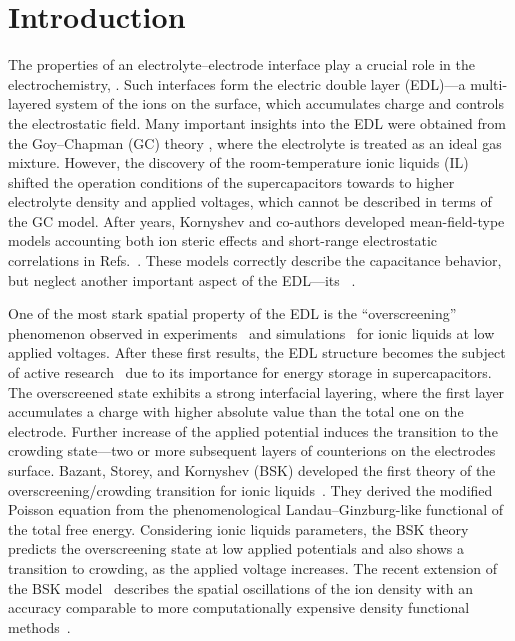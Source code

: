 \section{Introduction}
The properties of an electrolyte--electrode interface play a crucial role in the electrochemistry, . 
Such interfaces form the electric double layer (EDL)---a multi-layered system of the ions on the surface, which accumulates charge and controls the electrostatic field. Many important insights into the EDL were obtained from the Goy--Chapman (GC) theory , where the electrolyte is treated as an ideal gas mixture. However, the discovery of the room-temperature ionic liquids (IL) shifted the operation conditions of the supercapacitors towards to higher electrolyte density and applied voltages, which cannot be described in terms of the GC model. After years, Kornyshev and co-authors developed mean-field-type models accounting both ion steric effects and short-range electrostatic correlations in Refs.~\cite{kornyshev2007double,goodwin2017mean}. These models correctly describe the capacitance behavior, but neglect another important aspect of the EDL---its ~\cite{fedorov2008ionic}. 

One of the most stark spatial property of the EDL is the ``overscreening'' phenomenon observed in experiments~\cite{mezger2008molecular,zhou2012nanoscale} and simulations~\cite{lynden2007simulations,fedorov2008ionic,fedorov2010double} for ionic liquids at low applied voltages. After these first results, the EDL structure becomes the subject of active research~\cite{belotti2021experimental,toda2021observation,schlaich2021electronic} due to its importance for energy storage in supercapacitors. 
The overscreened state exhibits a strong interfacial layering, where the first layer accumulates a charge with higher absolute value than the total one on the electrode. 
Further increase of the applied potential induces the transition to the crowding state---two or more subsequent layers of counterions on the electrodes surface.   
Bazant, Storey, and Kornyshev (BSK) developed the first theory of the overscreening/crowding transition for ionic liquids~\cite{bazant2011double}. They derived the modified Poisson equation from the phenomenological Landau--Ginzburg-like functional of the total free energy. 
Considering ionic liquids parameters, the BSK theory predicts the overscreening state at low applied potentials and also shows a transition to crowding, as the applied voltage increases. The recent extension of the BSK model~\cite{de2020interfacial} describes the spatial oscillations of the ion density with an accuracy comparable to more computationally expensive density functional methods~\cite{gavish2018solvent,ma2020classical}. 

